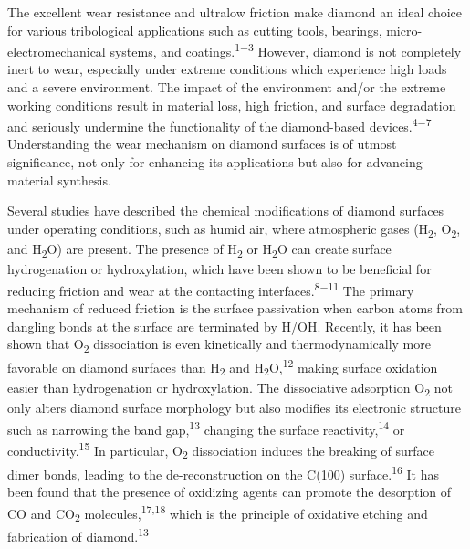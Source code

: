 \documentclass{article}
\begin{document}
The excellent wear resistance and ultralow friction make diamond an ideal choice for various tribological applications such as cutting tools, bearings, micro-electromechanical systems, and coatings.\textsuperscript{1−3} However, diamond is not completely inert to wear, especially under extreme conditions which experience high loads and a severe environment. The impact of the environment and/or the extreme working conditions result in material loss, high friction, and surface degradation and seriously undermine the functionality of the diamond-based devices.\textsuperscript{4−7} Understanding the wear mechanism on diamond surfaces is of utmost significance, not only for enhancing its applications but also for advancing material synthesis.

Several studies have described the chemical modifications of diamond surfaces under operating conditions, such as humid air, where atmospheric gases (H\textsubscript{2}, O\textsubscript{2}, and H\textsubscript{2}O) are present. The presence of H\textsubscript{2} or H\textsubscript{2}O can create surface hydrogenation or hydroxylation, which have been shown to be beneficial for reducing friction and wear at the contacting interfaces.\textsuperscript{8−11} The primary mechanism of reduced friction is the surface passivation when carbon atoms from dangling bonds at the surface are terminated by H/OH. Recently, it has been shown that O\textsubscript{2} dissociation is even kinetically and thermodynamically more favorable on diamond surfaces than H\textsubscript{2} and H\textsubscript{2}O,\textsuperscript{12} making surface oxidation easier than hydrogenation or hydroxylation. The dissociative adsorption O\textsubscript{2} not only alters diamond surface morphology but also modifies its electronic structure such as narrowing the band gap,\textsuperscript{13} changing the surface reactivity,\textsuperscript{14} or conductivity.\textsuperscript{15} In particular, O\textsubscript{2} dissociation induces the breaking of surface dimer bonds, leading to the de-reconstruction on the C(100) surface.\textsuperscript{16} It has been found that the presence of oxidizing agents can promote the desorption of CO and CO\textsubscript{2} molecules,\textsuperscript{17,18} which is the principle of oxidative etching and fabrication of diamond.\textsuperscript{13}
\end{document}
